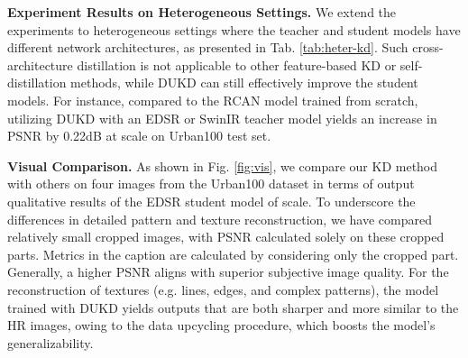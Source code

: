 \documentclass[10pt,twocolumn,letterpaper]{article}
\begin{document}
\begin{table}[]
	\centering
	\caption{The results of heterogeneous distillation using DUKD on the  scale RCAN model. The DUKD supports cross-architecture distillation, allowing a more powerful teacher model for KD.}\vspace{-0.5em}
	\label{tab:heter-kd}
\end{table}

 
\noindent\textbf{Experiment Results on Heterogeneous Settings. }
We extend the experiments to heterogeneous settings where the teacher and student models have different network architectures, as presented in Tab. \ref{tab:heter-kd}. Such cross-architecture distillation is not applicable to other feature-based KD or self-distillation methods, while DUKD can still effectively improve the student models.
For instance, compared to the RCAN model trained from scratch, utilizing DUKD with an EDSR or SwinIR teacher model yields an increase in PSNR by 0.22dB at  scale on Urban100 test set.

\noindent\textbf{Visual Comparison. }
As shown in Fig. \ref{fig:vis}, we compare our KD method with others on four images from the Urban100 dataset in terms of output qualitative results of the EDSR student model of  scale. To underscore the differences in detailed pattern and texture reconstruction, we have compared relatively small cropped images, with PSNR calculated solely on these cropped parts. Metrics in the caption are calculated by considering only the cropped part.  Generally, a higher PSNR aligns with superior subjective image quality.  For the reconstruction of textures (e.g. lines, edges, and complex patterns), the model trained with DUKD yields outputs that are both sharper and more similar to the HR images, owing to the data upcycling procedure, which boosts the model's generalizability.
\end{document}
